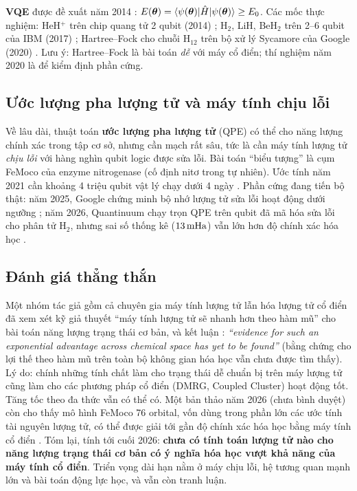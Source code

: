\textbf{VQE}  được đề xuất năm 2014 \cite{Peruzzo2014}: $E(\boldsymbol\theta)=\langle\psi(\boldsymbol\theta)|\hat H|\psi(\boldsymbol\theta)\rangle\ge E_0$. Các mốc thực nghiệm: HeH$^+$ trên chip quang tử 2 qubit (2014) \cite{Peruzzo2014}; H$_2$, LiH, BeH$_2$ trên 2--6 qubit của IBM (2017) \cite{Kandala2017}; Hartree--Fock cho chuỗi H$_{12}$ trên bộ xử lý Sycamore của Google (2020) \cite{Google2020}. Lưu ý: Hartree--Fock là bài toán \emph{dễ} với máy cổ điển; thí nghiệm năm 2020 là để kiểm định phần cứng.

\subsection{Ước lượng pha lượng tử và máy tính chịu lỗi}
Về lâu dài, thuật toán \textbf{ước lượng pha lượng tử} (QPE) có thể cho năng lượng chính xác trong tập cơ sở, nhưng cần mạch rất sâu, tức là cần máy tính lượng tử \emph{chịu lỗi}  với hàng nghìn qubit logic được sửa lỗi. Bài toán ``biểu tượng'' là cụm FeMoco của enzyme nitrogenase (cố định nitơ trong tự nhiên). Ước tính năm 2021 cần khoảng 4 triệu qubit vật lý chạy dưới 4 ngày \cite{LeeTHC2021}. Phần cứng đang tiến bộ thật: năm 2025, Google chứng minh bộ nhớ lượng tử sửa lỗi hoạt động dưới ngưỡng \cite{Willow2025}; năm 2026, Quantinuum chạy trọn QPE trên qubit đã mã hóa sửa lỗi cho phân tử H$_2$, nhưng sai số thống kê ($13\,\mathrm{mHa}$) vẫn lớn hơn độ chính xác hóa học \cite{Yamamoto2026}.

\subsection{Đánh giá thẳng thắn}
Một nhóm tác giả gồm cả chuyên gia máy tính lượng tử lẫn hóa lượng tử cổ điển đã xem xét kỹ giả thuyết ``máy tính lượng tử sẽ nhanh hơn theo hàm mũ'' cho bài toán năng lượng trạng thái cơ bản, và kết luận \cite{Lee2023}: \emph{``evidence for such an exponential advantage across chemical space has yet to be found''} (bằng chứng cho lợi thế theo hàm mũ trên toàn bộ không gian hóa học vẫn chưa được tìm thấy). Lý do: chính những tính chất làm cho trạng thái dễ chuẩn bị trên máy lượng tử cũng làm cho các phương pháp cổ điển (DMRG, Coupled Cluster) hoạt động tốt. Tăng tốc theo đa thức vẫn có thể có. Một bản thảo năm 2026 (chưa bình duyệt) còn cho thấy mô hình FeMoco 76 orbital, vốn dùng trong phần lớn các ước tính tài nguyên lượng tử, có thể được giải tới gần độ chính xác hóa học bằng máy tính cổ điển \cite{Zhai2026}. Tóm lại, tính tới cuối 2026: \textbf{chưa có tính toán lượng tử nào cho năng lượng trạng thái cơ bản có ý nghĩa hóa học vượt khả năng của máy tính cổ điển}. Triển vọng dài hạn nằm ở máy chịu lỗi, hệ tương quan mạnh lớn và bài toán động lực học, và vẫn còn tranh luận.


